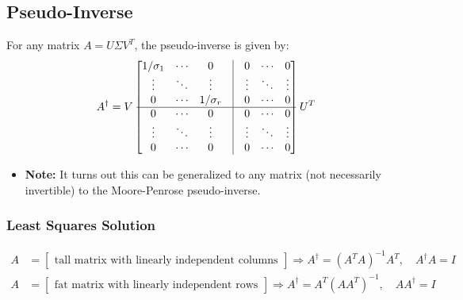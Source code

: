 \subsection{Pseudo-Inverse}
\begin{definition}
    For any matrix \( A = U \Sigma V^T \), the pseudo-inverse is given by:
    \begin{equation*}
    A^{\dagger} = V 
    \begin{bmatrix}
        1/\sigma_1 & \cdots & 0 & \vline & 0 & \cdots & 0 \\
        \vdots & \ddots & \vdots & \vline & \vdots & \ddots & \vdots \\
        0 & \cdots & 1/\sigma_r & \vline & 0 & \cdots & 0 \\
        \hline
        0 & \cdots & 0 & \vline & 0 & \cdots & 0 \\
        \vdots & \ddots & \vdots & \vline & \vdots & \ddots & \vdots \\
        0 & \cdots & 0 & \vline & 0 & \cdots & 0 
    \end{bmatrix}
    U^T
    \end{equation*}
    \begin{itemize}
        \item \textbf{Note:} It turns out this can be generalized to any matrix (not necessarily invertible) to the Moore-Penrose pseudo-inverse.
    \end{itemize}
\end{definition}

\subsubsection{Least Squares Solution}
\begin{definition}
    \begin{align*}
        A &= 
        \begin{bmatrix}
        \text{tall matrix with linearly independent columns}
        \end{bmatrix} 
        \Rightarrow A^{\dagger} = (A^T A)^{-1} A^T, \quad A^{\dagger} A = I \\
        A &= 
        \begin{bmatrix}
        \text{fat matrix with linearly independent rows}
        \end{bmatrix}
        \Rightarrow A^{\dagger} = A^T (A A^T)^{-1}, \quad A A^{\dagger} = I
    \end{align*}
\end{definition}

